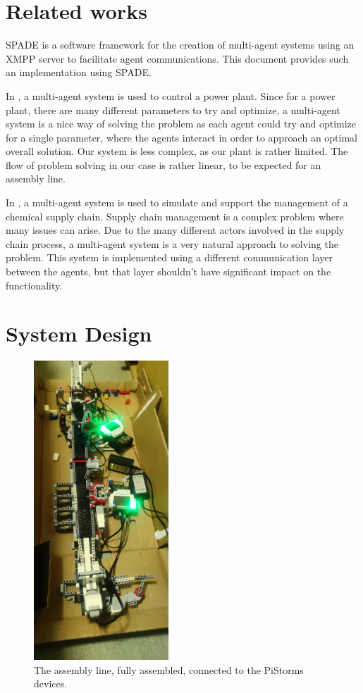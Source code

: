 \documentclass[conference]{IEEEtran}
\begin{document}
\section{Related works}

SPADE \cite{SPADE} is a software framework for the creation of multi-agent systems using an XMPP server to facilitate agent communications. This document provides such an implementation using SPADE. 

In \cite{powerplant}, a multi-agent system is used to control a power plant. Since for a power plant, there are many different parameters to try and optimize, a multi-agent system is a nice way of solving the problem as each agent could try and optimize for a single parameter, where the agents interact in order to approach an optimal overall solution. Our system is less complex, as our plant is rather limited. The flow of problem solving in our case is rather linear, to be expected for an assembly line. 

In \cite{Chemical}, a multi-agent system is used to simulate and support the management of a chemical supply chain. Supply chain management is a complex problem where many issues can arise. Due to the many different actors involved in the supply chain process, a multi-agent system is a very natural approach to solving the problem. This system is implemented using a different communication layer between the agents, but that layer shouldn't have significant impact on the functionality. 


\section{System Design}


\begin{figure}[htbp]
\centerline{\includegraphics[width=0.45\textwidth]{images/assembly.jpg}}
\caption{The assembly line, fully assembled, connected to the PiStorms devices.}
\label{assemblyFig}
\end{figure}
\end{document}
